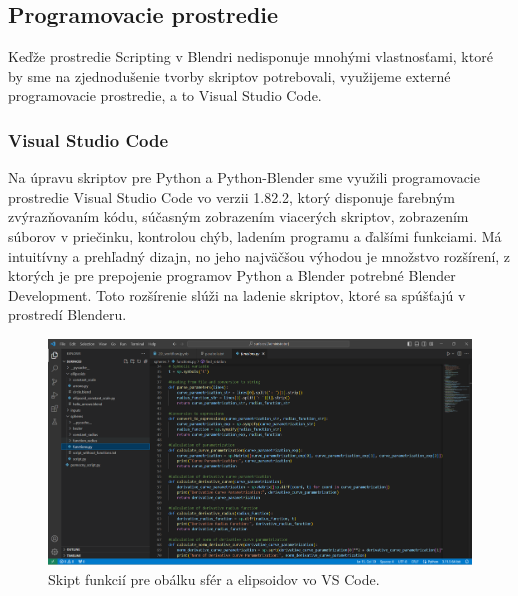 \subsection{Programovacie prostredie}
Keďže prostredie Scripting v Blendri nedisponuje mnohými vlastnosťami, ktoré by sme na zjednodušenie tvorby skriptov potrebovali, využijeme externé programovacie prostredie, a to Visual Studio Code. 
\subsubsection{Visual Studio Code}
Na úpravu skriptov pre Python a Python-Blender sme využili programovacie prostredie Visual Studio Code vo verzii 1.82.2, ktorý disponuje farebným zvýrazňovaním kódu, súčasným zobrazením viacerých skriptov, zobrazením súborov v priečinku, kontrolou chýb, ladením programu a ďalšími funkciami. Má intuitívny a prehľadný dizajn, no jeho najväčšou výhodou je množstvo rozšírení, z ktorých je pre prepojenie programov Python a Blender potrebné Blender Development. Toto rozšírenie slúži na ladenie skriptov, ktoré sa spúšťajú v prostredí Blenderu.

\begin{figure}[h]
	\centering
	\includegraphics[width=\textwidth]{images/vscode.png}
	\caption[Softvér Visual Studio Code.]{Skipt funkcií pre obálku sfér a elipsoidov vo VS Code.}
	\label{fig:vscode}
\end{figure}

